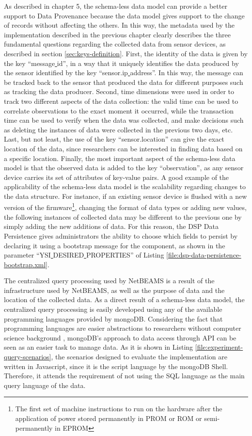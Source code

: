 As described in chapter 5, the schema-less data model can provide a better
support to Data Provenance because the data model gives support to the change
of records without affecting the others. In this way, the metadata used by the
implementation described in the previous chapter clearly describes the three
fundamental questions regarding the collected data from sensor devices, as
described in section \ref{sec:keys-definition}. First, the identity of the data
is given by the key ``message\underline{ }id'', in a way that it uniquely
identifies the data produced by the sensor identified by the key
``sensor.ip\underline{ }address''. In this way, the message can be tracked back
to the sensor that produced the data for different purposes such as tracking
the data producer. Second, time dimensions were used in order to track two
different aspects of the data collection: the valid time can be used to
correlate observations to the exact moment it occurred, while the transaction
time can be used to verify when the data was collected, and make decisions such
as deleting the instances of data were collected in the previous two days, etc.
Last, but not least, the use of the key ``sensor.location'' can give the exact
location of the data, since researchers can be interested in finding data based
on a specific location. Finally, the most important aspect of the schema-less
data model is that the observed data is added to the key ``observation'', as
any sensor device carries its set of attributes of key-value pairs. A good
example of the applicability of the schema-less data model is the scalability
regarding changes to the data structure. For instance, if an existing sensor
device is flushed with a new version of the firmware\footnote{The first set of
machine instructions to run on the hardware after the application of power stored
permanently in PROM or ROM or semi-permanently in EPROM}, changing the format
of data types or adding new values, the following instances of collected data
may be different to the previous one by simply adding the new additions of
data. For this reason, the DSP Data Persistence gives administrators the
ability to choose which fields to persist by declaring it using a bootstrap
message for the component, as shown in the parameter
``YSI\underline{ }DESIRED\underline{ }PROPERTIES'' of Listing
\ref{file:dsp-data-persistence-bootstrap.xml}.

The centralized query processing used by NetBEAMS is a result of the
infrastructure used by NetBEAMS, as well as the purpose of data and the
location of the collected data. As a direct result of a schema-less data
model, the centralized query processing is easily developed using any of the
available programming languages provided by mongoDB. Considering the fact that
programming languages are easier abstractions to researchers without computer
science background \cite{sn-programming-language}, mongoDB's approach to data
access through API can be seen as an easier task to manage data. As it is shown
in Listing \ref{file:experiment-query-scenarios}, the scenarios designed to
evaluate the implementation are written in Javascript, since it is the script
language by the mongoDB Shell. Therefore, it attends the requirement of not
using the SQL language as the main query language of the data.

